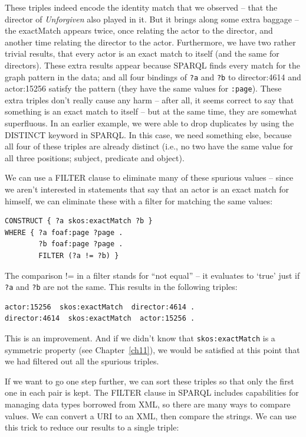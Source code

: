 \begin{challenge}
These triples indeed encode the identity match that we observed -- that
the director of \emph{Unforgiven} also played in it. But it brings along
some extra baggage -- the exactMatch appears twice, once relating the
actor to the director, and another time relating the director to the
actor. Furthermore, we have two rather trivial results, that every actor
is an exact match to itself (and the same for directors). These extra
results appear because SPARQL finds every match for the graph pattern in
the data; and all four bindings of \texttt{?a} and \texttt{?b} to director:4614 and
actor:15256 satisfy the pattern (they have the same values for \texttt{:page}).
These extra triples don't really cause any harm -- after all, it seems
correct to say that something is an exact match to itself -- but at the
same time, they are somewhat superfluous. In an earlier example, we were
able to drop duplicates by using the DISTINCT keyword in SPARQL. In this
case, we need something else, because  all four of these triples are
already distinct (i.e., no two have the same value for all three
positions; subject, predicate and object).

We can use a FILTER clause to eliminate many of these spurious values --
since we aren't interested in statements that say that an actor is an
exact match for himself, we can eliminate these with a filter for
matching the same values:

\begin{lstlisting}
CONSTRUCT { ?a skos:exactMatch ?b }
WHERE { ?a foaf:page ?page . 
        ?b foaf:page ?page .
        FILTER (?a != ?b) }
\end{lstlisting}

The comparison != in a filter stands for ``not equal'' -- it evaluates
to `true' just if \texttt{?a} and \texttt{?b} are not the same. This results in the
following triples:

\begin{lstlisting}
actor:15256  skos:exactMatch  director:4614 .
director:4614  skos:exactMatch  actor:15256 .
\end{lstlisting}

This is an improvement. And if we didn't know that \texttt{skos:exactMatch} is a
symmetric property (see Chapter~\ref{ch11}), we would be satisfied at this point that we had filtered out all
the spurious triples.

If we want to go one step further, we can sort these triples so that
only the first one in each pair is kept. The FILTER clause in SPARQL
includes capabilities for managing data types borrowed from XML, so
there are many ways to compare values. We can convert a URI to an XML,
then compare the strings. We can use this trick to reduce our results to
a single triple:


\end{challenge}
